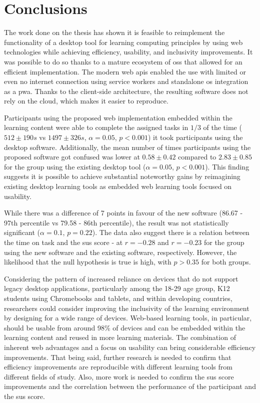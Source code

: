 \chapter{Conclusions}
\label{Conclusions}

The work done on the thesis has shown it is feasible to reimplement the functionality of a desktop tool for learning computing principles by using web technologies while achieving efficiency, usability, and inclusivity improvements.
It was possible to do so thanks to a mature ecosystem of \gls{oss} that allowed for an efficient implementation.
The modern web \glspl{api} enabled the use with limited or even no internet connection using service workers and standalone \gls{os} integration as a \gls{pwa}.
Thanks to the client-side architecture, the resulting software does not rely on the cloud, which makes it easier to reproduce.

Participants using the proposed web implementation embedded within the learning content were able to complete the assigned tasks in $1/3$ of the time ($512 \pm190 s$ vs $1497 \pm326 s$, $\alpha=0.05$, $p<0.001$) it took participants using the desktop software.
Additionally, the mean number of times participants using the proposed software got confused was lower at $0.58 \pm 0.42$ compared to $2.83 \pm 0.85$ for the group using the existing desktop tool ($\alpha=0.05$, $p<0.001$).
This finding suggests it is possible to achieve substantial noteworthy gains by reimagining existing desktop learning tools as embedded web learning tools focused on usability.

While there was a difference of 7 points in favour of the new software (86.67 - 97th percentile vs 79.58 - 86th percentile), the result was not statistically significant ($\alpha=0.1$, $p=0.22$).
The data also suggest there is a relation between the time on task and the \gls{sus} score - at $r=-0.28$ and $r=-0.23$ for the group using the new software and the existing software, respectively.
However, the likelihood that the null hypothesis is true is high, with $p > 0.35$ for both groups.

Considering the pattern of increased reliance on devices that do not support legacy desktop applications, particularly among the 18-29 age group, K12 students using Chromebooks and tablets, and within developing countries, researchers could consider improving the inclusivity of the learning environment by designing for a wide range of devices.
Web-based learning tools, in particular, should be usable from around 98\% of devices and can be embedded within the learning content and reused in more learning materials.
The combination of inherent web advantages and a focus on usability can bring considerable efficiency improvements.
That being said, further research is needed to confirm that efficiency improvements are reproducible with different learning tools from different fields of study.
Also, more work is needed to confirm the \gls{sus} score improvements and the correlation between the performance of the participant and the \gls{sus} score.
